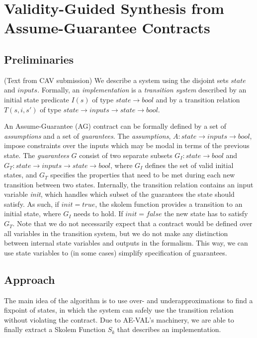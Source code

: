 \documentclass{article}
\begin{document}
\section{Validity-Guided Synthesis from Assume-Guarantee Contracts}

\subsection{Preliminaries}
(Text from CAV submission)
We describe a system using the disjoint sets $state$ and $inputs$.
Formally, an \emph{implementation} is a \emph{transition system}
described by an initial state predicate $I(s)$ of type $state \to
bool$ and by a transition relation $T(s,i,s')$ of type $state \to
inputs \to state \to bool$.

An Assume-Guarantee (AG) contract can be formally defined by a set of
\emph{assumptions} and a set of \emph{guarantees}. The
\emph{assumptions}, $A: state \rightarrow inputs \rightarrow bool$,
impose constraints over the inputs which may be modal in terms of the
previous state. The \emph{guarantees} $G$ consist of two separate
subsets $G_I: state \rightarrow bool$ and $G_T: state \rightarrow
inputs \rightarrow state \rightarrow bool$, where $G_I$ defines the
set of valid initial states, and $G_T$ specifies the properties that
need to be met during each new transition between two states. Internally, the transition relation contains an input variable
\textit{init}, which handles which subset of the guarantees the state should
satisfy. As such, if $init = true$, the skolem function provides a transition to
an initial state, where $G_I$ needs to hold. If $init = false$ the new state has
to satisfy $G_T$. Note that we do not necessarily expect that a contract would
be defined over all variables in the transition system, but we do not make any
distinction between internal state variables and outputs in the
formalism. This way, we can use state variables to (in some cases)
simplify specification of guarantees.

\subsection{Approach}

The main idea of the algorithm is to use over- and underapproximations to
find a fixpoint of states, in which the system can safely use
the transition relation without violating the contract. Due to AE-VAL's
machinery, we are able to finally extract a Skolem Function $S_k$ that describes an implementation.
\end{document}
